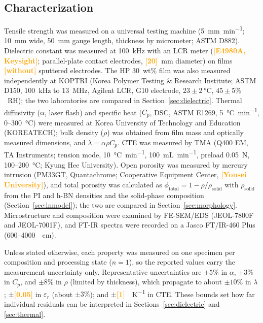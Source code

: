 \documentclass[preprint,a4paper]{elsarticle}
\newcommand{\eps}{\ensuremath{\varepsilon_r}}   %
\newcommand{\lam}{\ensuremath{\lambda}}
\newcommand{\hl}[1]{\textcolor{orange}{\textbf{[#1]}}}
\begin{document}
\subsection{Characterization}
\label{sec:char}
Tensile strength was measured on a universal testing machine (\SI{5}{\mm\per\minute}; \SI{10}{\mm} wide, \SI{50}{\mm} gauge length, thickness by micrometer; ASTM D882). Dielectric constant was measured at \SI{100}{\kilo\hertz} with an LCR meter (\hl{E4980A, Keysight}; parallel-plate contact electrodes, \hl{20}~mm diameter) on films \hl{without} sputtered electrodes. The HP 30~wt\% film was also measured independently at KOPTRI (Korea Polymer Testing \& Research Institute; ASTM D150, \SI{100}{\kilo\hertz} to \SI{13}{\mega\hertz}, Agilent LCR, G10 electrode, $23 \pm \SI{2}{\celsius}$, $45 \pm 5\%$~RH); the two laboratories are compared in Section~\ref{sec:dielectric}. Thermal diffusivity ($\alpha$, laser flash) and specific heat ($C_p$, DSC, ASTM E1269, \SI{5}{\celsius\per\minute}, 0--\SI{300}{\celsius}) were measured at Korea University of Technology and Education (KOREATECH); bulk density ($\rho$) was obtained from film mass and optically measured dimensions, and $\lam = \alpha\rho C_p$. CTE was measured by TMA (Q400 EM, TA Instruments; tension mode, \SI{10}{\celsius\per\minute},  \SI{100}{\milli\liter\per\minute}, preload \SI{0.05}{\newton}, 100--\SI{200}{\celsius}; Kyung Hee University). Open porosity was measured by mercury intrusion (PM33GT, Quantachrome; Cooperative Equipment Center, \hl{Yonsei University}), and total porosity was calculated as $\phi_{\mathrm{total}} = 1 - \rho/\rho_{\mathrm{solid}}$ with $\rho_{\mathrm{solid}}$ from the PI and h-BN densities and the solid-phase composition (Section~\ref{sec:lnmodel}); the two are compared in Section~\ref{sec:morphology}. Microstructure and composition were examined by FE-SEM/EDS (JEOL-7800F and JEOL-7001F), and FT-IR spectra were recorded on a Jasco FT/IR-460 Plus (600--\SI{4000}{\per\cm}).

Unless stated otherwise, each property was measured on one specimen per composition and processing state ($n = 1$), so the reported values carry the measurement uncertainty only. Representative uncertainties are $\pm 5\%$ in $\alpha$, $\pm 3\%$ in $C_p$, and $\pm 8\%$ in $\rho$ (limited by thickness), which propagate to about $\pm 10\%$ in \lam; $\pm$\hl{0.05} in \eps{} (about $\pm 3\%$); and $\pm$\hl{1}~\si{\ppm\per\kelvin} in CTE. These bounds set how far individual residuals can be interpreted in Sections~\ref{sec:dielectric} and \ref{sec:thermal}.
\end{document}
